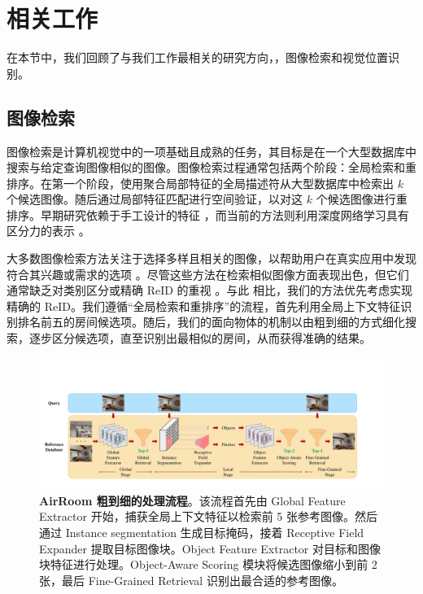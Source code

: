 \section{相关工作}
\label{sec:related_work}

在本节中，我们回顾了与我们工作最相关的研究方向，\ie，图像检索和视觉位置识别。

\subsection{图像检索}

图像检索是计算机视觉中的一项基础且成熟的任务，其目标是在一个大型数据库中搜索与给定查询图像相似的图像。图像检索过程通常包括两个阶段：全局检索和重排序。在第一个阶段，使用聚合局部特征的全局描述符从大型数据库中检索出 $k$ 个候选图像。随后通过局部特征匹配进行空间验证，以对这 $k$ 个候选图像进行重排序。早期研究依赖于手工设计的特征 \cite{Lowe2004DistinctiveIF, BAY2008346}，而当前的方法则利用深度网络学习具有区分力的表示 \cite{cao2020unifyingdeeplocalglobal, radenović2018finetuningcnnimageretrieval}。

大多数图像检索方法关注于选择多样且相关的图像，以帮助用户在真实应用中发现符合其兴趣或需求的选项 \cite{Wan2014DeepLF}。尽管这些方法在检索相似图像方面表现出色，但它们通常缺乏对类别区分或精确 ReID 的重视 \cite{10.1145/1348246.1348248}。与此 \mbox{相比}，我们的方法优先考虑实现精确的 ReID。我们遵循“全局检索和重排序”的流程，首先利用全局上下文特征识别排名前五的房间候选项。随后，我们的面向物体的机制以由粗到细的方式细化搜索，逐步区分候选项，直至识别出最相似的房间，从而获得准确的结果。

\begin{figure}[ht]
    \centering
    \includegraphics[width=\textwidth]{pipeline_font.pdf}
    \vspace{-16pt}
    \caption{\textbf{AirRoom 粗到细的处理流程}。该流程首先由 Global Feature Extractor 开始，捕获全局上下文特征以检索前 5 张参考图像。然后通过 Instance segmentation 生成目标掩码，接着 Receptive Field Expander 提取目标图像块。Object Feature Extractor 对目标和图像块特征进行处理。Object-Aware Scoring 模块将候选图像缩小到前 2 张，最后 Fine-Grained Retrieval 识别出最合适的参考图像。}
    \vspace{-15pt}
    \label{fig:pipeline}
\end{figure}
